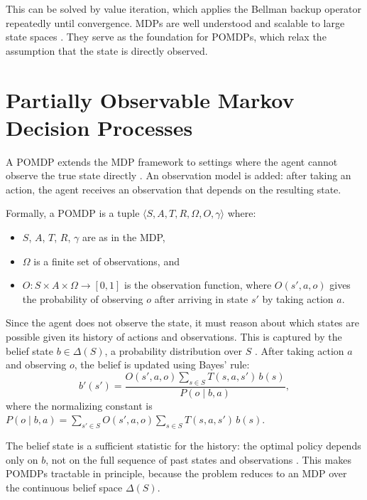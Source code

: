 This can be solved by value iteration, which applies the Bellman backup operator repeatedly until convergence.
MDPs are well understood and scalable to large state spaces \cite{mdpBasedRecommenderSystem}.
They serve as the foundation for POMDPs, which relax the assumption that the state is directly observed.


\section{Partially Observable Markov Decision Processes}
\label{sec:pomdp}

A POMDP extends the MDP framework to settings where the agent cannot observe the true state directly \cite{astrom1965optimal,kaelblingPlanningActingPartially1998}.
An observation model is added: after taking an action, the agent receives an observation that depends on the resulting state.

Formally, a POMDP is a tuple $\langle S, A, T, R, \Omega, O, \gamma \rangle$ where:
\begin{itemize}
  \item $S$, $A$, $T$, $R$, $\gamma$ are as in the MDP,
  \item $\Omega$ is a finite set of observations, and
  \item $O: S \times A \times \Omega \rightarrow [0,1]$ is the observation function, where $O(s', a, o)$ gives the probability of observing $o$ after arriving in state $s'$ by taking action $a$.
\end{itemize}

Since the agent does not observe the state, it must reason about which states are possible given its history of actions and observations.
This is captured by the belief state $b \in \Delta(S)$, a probability distribution over $S$ \cite{pomdpIntroNotes}.
After taking action $a$ and observing $o$, the belief is updated using Bayes' rule:
\begin{equation}
  b'(s') = \frac{O(s', a, o) \sum_{s \in S} T(s, a, s')\, b(s)}{P(o \mid b, a)},
\end{equation}
where the normalizing constant is $P(o \mid b, a) = \sum_{s' \in S} O(s', a, o) \sum_{s \in S} T(s, a, s')\, b(s)$.

The belief state is a sufficient statistic for the history: the optimal policy depends only on $b$, not on the full sequence of past states and observations \cite{smallwood1973optimal}.
This makes POMDPs tractable in principle, because the problem reduces to an MDP over the continuous belief space $\Delta(S)$.


